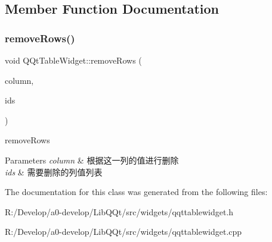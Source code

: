 \subsection{Member Function Documentation}
\mbox{\label{class_q_qt_table_widget_a919120d6fc5631f2121e79c902d2d531}} 
\subsubsection{\texorpdfstring{remove\+Rows()}{removeRows()}}
{\footnotesize\ttfamily void Q\+Qt\+Table\+Widget\+::remove\+Rows (\begin{DoxyParamCaption}\item[{int}]{column,  }\item[{Q\+List$<$ Q\+String\+List $>$}]{ids }\end{DoxyParamCaption})}



remove\+Rows 


\begin{DoxyParams}{Parameters}
{\em column} & 根据这一列的值进行删除 \\
\hline
{\em ids} & 需要删除的列值列表 \\
\hline
\end{DoxyParams}


The documentation for this class was generated from the following files\+:\begin{DoxyCompactItemize}
\item 
R\+:/\+Develop/a0-\/develop/\+Lib\+Q\+Qt/src/widgets/qqttablewidget.\+h\item 
R\+:/\+Develop/a0-\/develop/\+Lib\+Q\+Qt/src/widgets/qqttablewidget.\+cpp\end{DoxyCompactItemize}
